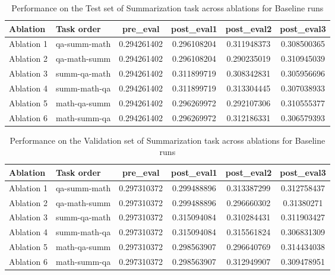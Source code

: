\begin{table}[!ht]
    \centering
    \caption{Performance on the Test set of Summarization task across ablations for Baseline runs}
    \begin{tabular}{|l|l|S[table-format=2.4]|S[table-format=2.4]|S[table-format=2.4]|S[table-format=2.4]|}
    \hline
        \textbf{Ablation} & \textbf{Task order} & \textbf{pre\_eval} & \textbf{post\_eval1} & \textbf{post\_eval2} & \textbf{post\_eval3 } \\ \hline
        Ablation 1 & qa-summ-math & 0.294261402 & 0.296108204 & 0.311948373 & 0.308500365  \\ 
        Ablation 2 & qa-math-summ & 0.294261402 & 0.296108204 & 0.290235019 & 0.310945039  \\ 
        Ablation 3 & summ-qa-math & 0.294261402 & 0.311899719 & 0.308342831 & 0.305956696  \\ 
        Ablation 4 & summ-math-qa & 0.294261402 & 0.311899719 & 0.313304445 & 0.307038933  \\ 
        Ablation 5 & math-qa-summ & 0.294261402 & 0.296269972 & 0.292107306 & 0.310555377  \\ 
        Ablation 6 & math-summ-qa & 0.294261402 & 0.296269972 & 0.312186331 & 0.306579393  \\ \hline
    \end{tabular}
    \label{tab:SummTestBaseline}
\end{table}

\begin{table}[!ht]
    \centering
    \caption{Performance on the Validation set of Summarization task across ablations for Baseline runs}
    \begin{tabular}{|l|l|S[table-format=2.4]|S[table-format=2.4]|S[table-format=2.4]|S[table-format=2.4]|}
    \hline
        \textbf{Ablation} & \textbf{Task order} & \textbf{pre\_eval} & \textbf{post\_eval1} & \textbf{post\_eval2} & \textbf{post\_eval3 } \\ \hline
        Ablation 1 & qa-summ-math & 0.297310372 & 0.299488896 & 0.313387299 & 0.312758437  \\ 
        Ablation 2 & qa-math-summ & 0.297310372 & 0.299488896 & 0.296660302 & 0.31380271  \\ 
        Ablation 3 & summ-qa-math & 0.297310372 & 0.315094084 & 0.310284431 & 0.311903427  \\ 
        Ablation 4 & summ-math-qa & 0.297310372 & 0.315094084 & 0.315561824 & 0.306831309  \\ 
        Ablation 5 & math-qa-summ & 0.297310372 & 0.298563907 & 0.296640769 & 0.314434038  \\ 
        Ablation 6 & math-summ-qa & 0.297310372 & 0.298563907 & 0.312949907 & 0.309478951  \\ \hline
    \end{tabular}
    \label{tab:SummValBaseline}
\end{table}

